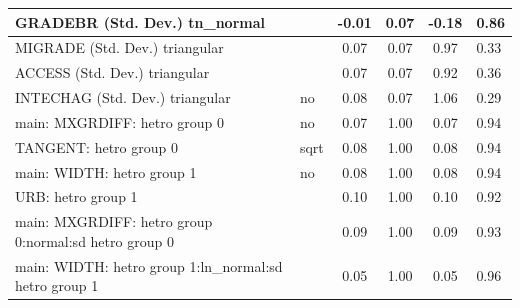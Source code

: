 \begin{table}
\begin{center}
\begin{tabular}{|l|l|c|c|c|l|}
			\hline
			GRADEBR (Std. Dev.) tn_normal &  & -0.01 & 0.07 & -0.18 & 0.86 \\
			\hline
			MIGRADE (Std. Dev.) triangular &  & 0.07 & 0.07 & 0.97 & 0.33 \\
			\hline
			ACCESS (Std. Dev.) triangular &  & 0.07 & 0.07 & 0.92 & 0.36 \\
			\hline
			INTECHAG (Std. Dev.) triangular & no & 0.08 & 0.07 & 1.06 & 0.29 \\
			\hline
			main: MXGRDIFF: hetro group 0 & no & 0.07 & 1.00 & 0.07 & 0.94 \\
			\hline
			TANGENT: hetro group 0 & sqrt & 0.08 & 1.00 & 0.08 & 0.94 \\
			\hline
			main: WIDTH: hetro group 1 & no & 0.08 & 1.00 & 0.08 & 0.94 \\
			\hline
			URB: hetro group 1 &  & 0.10 & 1.00 & 0.10 & 0.92 \\
			\hline
			main: MXGRDIFF: hetro group 0:normal:sd  hetro group 0 &  & 0.09 & 1.00 & 0.09 & 0.93 \\
			\hline
			main: WIDTH: hetro group 1:ln_normal:sd  hetro group 1 &  & 0.05 & 1.00 & 0.05 & 0.96 \\
			\hline
		\end{tabular}
	\end{center}
\end{table}